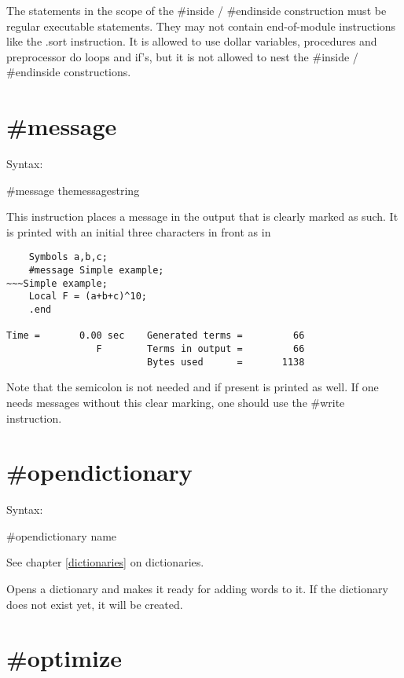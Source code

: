 \noindent The statements in the scope of the \#inside / \#endinside 
construction must be regular executable statements. They may not contain 
end-of-module instructions like the .sort instruction. It is allowed to use 
dollar variables, procedures and preprocessor do loops and if's, but it is 
not allowed to nest the \#inside / \#endinside constructions.


\section{\#message}
\label{premessage}

\noindent Syntax:

\#message themessagestring

\noindent This instruction places a message in the output 
that is clearly marked as such. It is printed with an initial three 
characters in front as in
\begin{verbatim}
    Symbols a,b,c;
    #message Simple example;
~~~Simple example;
    Local F = (a+b+c)^10;
    .end

Time =       0.00 sec    Generated terms =         66
                F        Terms in output =         66
                         Bytes used      =       1138
\end{verbatim}
Note that the semicolon is not needed and if present is 
printed as well. If one needs messages without this clear marking, one 
should use the \#write instruction.
 
 
\section{\#opendictionary}
\label{preopendictionary}

\noindent Syntax:

\#opendictionary name
 
\noindent See chapter \ref{dictionaries} on dictionaries.

\noindent Opens a dictionary and makes it ready for adding words to it. If 
the dictionary does not exist yet, it will be created.


\section{\#optimize}
\label{preoptimize}

